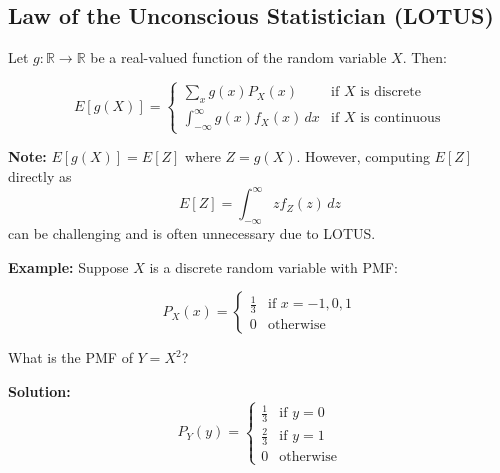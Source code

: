 \documentclass{article}
\begin{document}


    \subsection*{Law of the Unconscious Statistician (LOTUS)}

    Let $g : \mathbb{R} \to \mathbb{R}$ be a real-valued function of the random variable $X$. Then:

    \[
    E[g(X)] = 
    \begin{cases} 
        \sum_{x} g(x) P_X(x) & \text{if $X$ is discrete} \\[2ex]
        \int_{-\infty}^{\infty} g(x) f_X(x) \, dx & \text{if $X$ is continuous}
    \end{cases}
    \]

    \noindent
    \textbf{Note:} $E[g(X)] = E[Z]$ where $Z = g(X)$. However, computing $E[Z]$ directly as
    \[
    E[Z] = \int_{-\infty}^{\infty} z f_Z(z) \, dz
    \]
    can be challenging and is often unnecessary due to LOTUS.

    \vspace{1em}

    \noindent
    \textbf{Example:} Suppose $X$ is a discrete random variable with PMF:
    
    \[
    P_X(x) = 
    \begin{cases}
        \frac{1}{3} & \text{if } x = -1, 0, 1 \\
        0 & \text{otherwise}
    \end{cases}
    \]

    \noindent
    What is the PMF of $Y = X^2$?

    \vspace{0.5em}

    \noindent
    \textbf{Solution:}
    \[
    P_Y(y) = 
    \begin{cases}
        \frac{1}{3} & \text{if } y = 0 \\
        \frac{2}{3} & \text{if } y = 1 \\
        0 & \text{otherwise}
    \end{cases}
    \]
\end{document}
